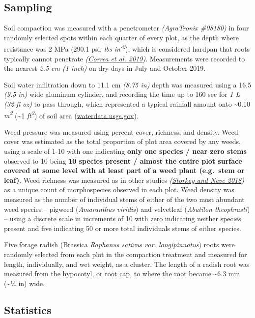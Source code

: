 \documentclass[
]{article}
\begin{document}
\hypertarget{sampling}{%
\subsection{Sampling}\label{sampling}}

Soil compaction was measured with a penetrometer \emph{(AgraTronix \#08180)} in four randomly selected spots within each quarter of every plot, as the depth where resistance was 2 MPa (290.1 psi, \emph{lbs in\textsuperscript{-2}}), which is considered hardpan that roots typically cannot penetrate \emph{(\protect\hyperlink{ref-correa19}{Correa et al. 2019})}.
Measurements were recorded to the nearest \emph{2.5 cm (1 inch)} on dry days in July and October 2019.

Soil water infiltration down to 11.1 cm \emph{(8.75 in)} depth was measured using a 16.5 \emph{(9.5 in)} wide aluminum cylinder, and recording the time up to 160 sec for \emph{1 L (32 fl oz)} to pass through, which represented a typical rainfall amount onto \textasciitilde0.10 \emph{m\textsuperscript{2}} (\textasciitilde1 \emph{ft\textsuperscript{2}}) of soil area (\url{waterdata.usgs.gov}).

Weed pressure was measured using percent cover, richness, and density.
Weed cover was estimated as the total proportion of plot area covered by any weeds,
using a scale of 1-10 with one indicating \textbf{only one species / near zero stems} observed to 10 being \textbf{10 species present / almost the entire plot surface covered at some level with at least part of a weed plant (e.g.~stem or leaf)}.
Weed richness was measured as in other studies \emph{(\protect\hyperlink{ref-storkey18}{Storkey and Neve 2018})} as a unique count of morphospecies observed in each plot.
Weed density was measured as the number of individual stems of either of the two most abundant weed species -- pigweed (\emph{Amaranthus viridis}) and velvetleaf (\emph{Abutilon theophrasti}) -- using a discrete scale in increments of 10 with zero indicating neither species present and five indicating 50 or more total individuals stems of either species.

Five forage radish (Brassica \emph{Raphanus sativus var. longipinnatus}) roots were randomly selected from each plot in the compaction treatment and measured for length, individually, and wet weight, as a cluster.
The length of a radish root was measured from the hypocotyl, or root cap, to where the root became \textasciitilde6.3 mm (\textasciitilde1⁄4 in) wide.

\hypertarget{statistics}{%
\subsection{Statistics}\label{statistics}}
\end{document}
